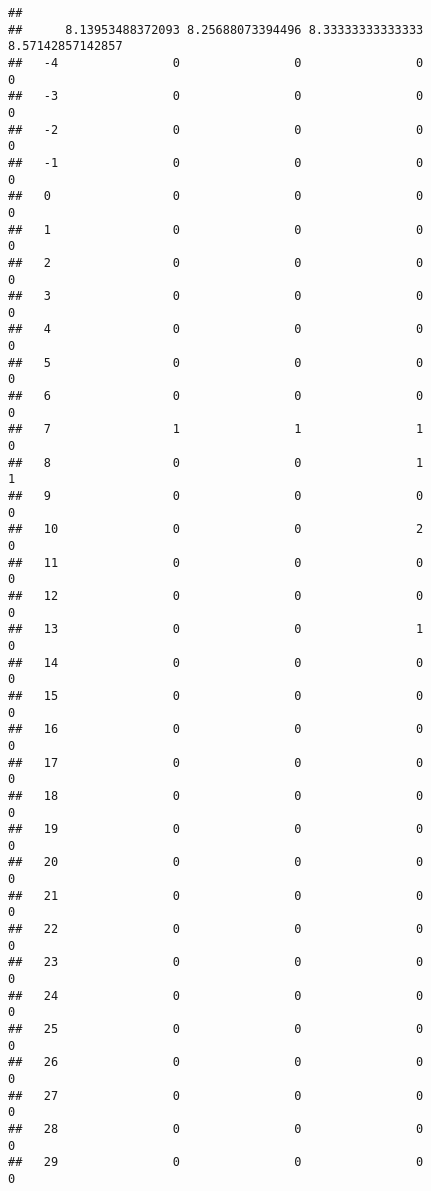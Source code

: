 \documentclass[]{article}
\begin{document}
\begin{verbatim}
##     
##      8.13953488372093 8.25688073394496 8.33333333333333 8.57142857142857
##   -4                0                0                0                0
##   -3                0                0                0                0
##   -2                0                0                0                0
##   -1                0                0                0                0
##   0                 0                0                0                0
##   1                 0                0                0                0
##   2                 0                0                0                0
##   3                 0                0                0                0
##   4                 0                0                0                0
##   5                 0                0                0                0
##   6                 0                0                0                0
##   7                 1                1                1                0
##   8                 0                0                1                1
##   9                 0                0                0                0
##   10                0                0                2                0
##   11                0                0                0                0
##   12                0                0                0                0
##   13                0                0                1                0
##   14                0                0                0                0
##   15                0                0                0                0
##   16                0                0                0                0
##   17                0                0                0                0
##   18                0                0                0                0
##   19                0                0                0                0
##   20                0                0                0                0
##   21                0                0                0                0
##   22                0                0                0                0
##   23                0                0                0                0
##   24                0                0                0                0
##   25                0                0                0                0
##   26                0                0                0                0
##   27                0                0                0                0
##   28                0                0                0                0
##   29                0                0                0                0

\end{verbatim}
\end{document}
